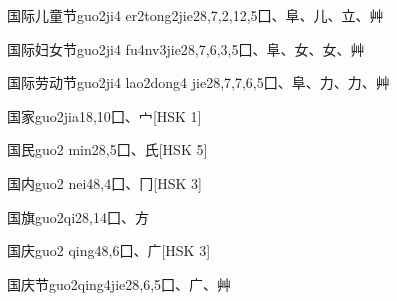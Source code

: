 \begin{EntryWithPhonetic}{国际儿童节}{guo2ji4 er2tong2jie2}{8,7,2,12,5}{⼞、⾩、⼉、⽴、⾋}
\end{EntryWithPhonetic}

\begin{EntryWithPhonetic}{国际妇女节}{guo2ji4 fu4nv3jie2}{8,7,6,3,5}{⼞、⾩、⼥、⼥、⾋}
\end{EntryWithPhonetic}

\begin{EntryWithPhonetic}{国际劳动节}{guo2ji4 lao2dong4 jie2}{8,7,7,6,5}{⼞、⾩、⼒、⼒、⾋}
\end{EntryWithPhonetic}

\begin{EntryWithPhonetic}{国家}{guo2jia1}{8,10}{⼞、⼧}[HSK 1]
\end{EntryWithPhonetic}

\begin{EntryWithPhonetic}{国民}{guo2 min2}{8,5}{⼞、⽒}[HSK 5]
\end{EntryWithPhonetic}

\begin{EntryWithPhonetic}{国内}{guo2 nei4}{8,4}{⼞、⼌}[HSK 3]
\end{EntryWithPhonetic}

\begin{EntryWithPhonetic}{国旗}{guo2qi2}{8,14}{⼞、⽅}
\end{EntryWithPhonetic}

\begin{EntryWithPhonetic}{国庆}{guo2 qing4}{8,6}{⼞、⼴}[HSK 3]
\end{EntryWithPhonetic}

\begin{EntryWithPhonetic}{国庆节}{guo2qing4jie2}{8,6,5}{⼞、⼴、⾋}
\end{EntryWithPhonetic}

